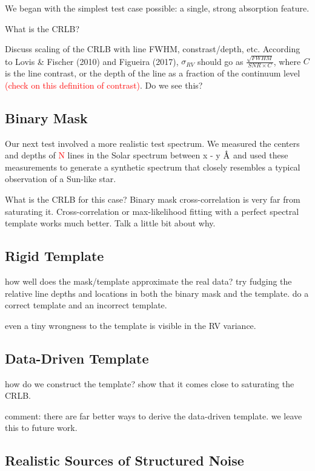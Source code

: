 \documentclass[modern]{aastex61}
\newcommand{\ang}{\text{\normalfont\AA}}
\newcommand{\todo}[1]{\textcolor{red}{#1}}  %
\begin{document}
We began with the simplest test case possible: a single, strong absorption feature.

What is the CRLB?

Discuss scaling of the CRLB with line FWHM, constrast/depth, etc. According to Lovis \& Fischer (2010) and Figueira (2017), $\sigma_{RV}$ should go as $\frac{\sqrt{FWHM}}{SNR \times C}$, where $C$ is the line contrast, or the depth of the line as a fraction of the continuum level \todo{(check on this definition of contrast)}. Do we see this?

\subsection{Binary Mask}

Our next test involved a more realistic test spectrum. We measured the centers and depths of \todo{N} lines in the Solar spectrum between {x - y} $\ang$ and used these measurements to generate a synthetic spectrum that closely resembles a typical observation of a Sun-like star.

What is the CRLB for this case? Binary mask cross-correlation is very far from saturating it. Cross-correlation or max-likelihood fitting with a perfect spectral template works much better. Talk a little bit about why.

\subsection{Rigid Template}

how well does the mask/template approximate the real data? try fudging the relative line depths and locations in both the binary mask and the template. do a correct template and an incorrect template.

even a tiny wrongness to the template is visible in the RV variance.

\subsection{Data-Driven Template}

how do we construct the template? show that it comes close to saturating the CRLB.

comment: there are far better ways to derive the data-driven template. we leave this to future work.

\subsection{Realistic Sources of Structured Noise}
\end{document}
